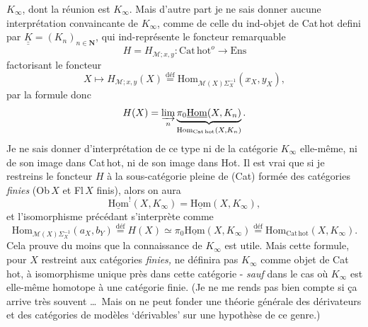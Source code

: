 \documentclass[11pt]{article}
\newcommand{\printedpage}[1]{\marginpar{\footnotesize p.~#1}}
\newcommand{\msp}[1]{\marginpar{\footnotesize [#1]}}
\newcommand{\Cathot}{\mathrm{Cat\,hot}}
\newcommand{\uHom}{\underline{\mathrm{Hom}}}
\newcommand{\uuK}{\underline{\underline{K}}}
\newcommand{\Hom}{\mathrm{Hom}}
\newcommand{\Ens}{\mathrm{Ens}}
\newcommand{\defeq}{\overset{\text{déf}}{=}}
\begin{document}
\printedpage{29}
$K_\infty$, dont la réunion est $K_\infty$. Mais d'autre part je ne sais donner aucune interprétation convaincante de $K_\infty$, comme de celle du ind-objet de Cat\,hot defini par $\uuK = (K_n)_{n\in\mathbf{N}}$, qui ind-représente le foncteur remarquable %
\[
H = H_{\mathcal{M};x,y} : \Cathot^{o} \longrightarrow \Ens
\]
factorisant le foncteur
\msp{page 45}
\[
X \longmapsto H_{\mathcal{M};x,y}(X) \defeq \Hom_{\mathcal{M}(X)\Sigma_X^{-1}}(x_X, y_X),
\]
par la formule donc
\[
H(X) = \varinjlim_{n} \underbrace{\pi_0\uHom(X, K_n)}_{\Hom_{\Cathot}(X,K_n)} .
\]
Je ne sais donner d'interprétation de ce type ni de la catégorie $K_\infty$ elle-même, ni de son image dans Cat\,hot, ni de son image dans Hot. Il est vrai que si je restreins le foncteur $H$ à la sous-catégorie pleine de (Cat) formée des catégories \textit{finies} (Ob\,$X$ et Fl\,$X$ finis), alors on aura
\[
\uHom^{!}(X, K_\infty) = \uHom(X, K_\infty),
\]
et l'isomorphisme précédant s'interprète comme %
\[
\Hom_{\mathcal{M}(X)\Sigma_X^{-1}}(a_X, b_Y) \defeq H(X) \simeq \pi_0\uHom(X, K_\infty) \defeq \Hom_{\Cathot}(X, K_\infty).
\]
 Cela prouve du moins que la connaissance de $K_\infty$ est utile. Mais cette formule, pour $X$ restreint aux catégories \textit{finies,} ne définira pas $K_\infty$ comme objet de Cat\,hot, à isomorphisme unique près dans cette catégorie - \textit{sauf} dans le cas où $K_\infty$ est elle-même homotope à une catégorie
\msp{page 46}
finie. (Je ne me rends pas bien compte si ça arrive très souvent \ldots\ Mais on ne peut fonder une théorie générale des dérivateurs et des catégories de modèles `dérivables' sur une hypothèse de ce genre.)
\end{document}
